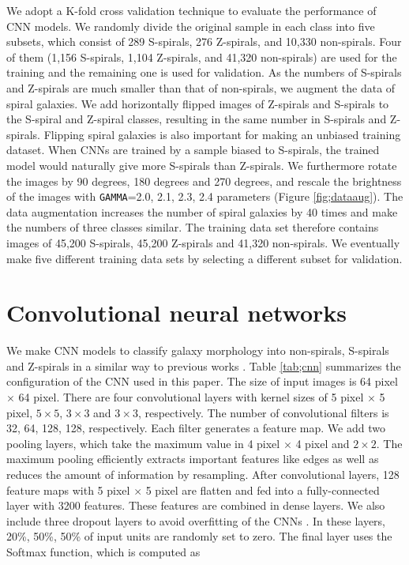 \documentclass[a4paper,fleqn,usenatbib]{mnras}
\begin{document}
We adopt a K-fold cross validation technique to evaluate the performance of CNN models.
We randomly divide the original sample in each class into five subsets, which consist of 289 S-spirals, 276 Z-spirals, and 10,330 non-spirals.
Four of them (1,156 S-spirals, 1,104 Z-spirals, and 41,320 non-spirals) are used for the training and the remaining one is used for validation.
As the numbers of S-spirals and Z-spirals are much smaller than that of non-spirals, we augment the data of spiral galaxies.
We add horizontally flipped images of Z-spirals and S-spirals to the S-spiral and Z-spiral classes, resulting in the same number in S-spirals and Z-spirals. 
Flipping spiral galaxies is also important for making an unbiased training dataset.
When CNNs are trained by a sample biased to S-spirals, the trained model would naturally give more S-spirals than Z-spirals.
We furthermore rotate the images by 90 degrees, 180 degrees and 270 degrees, and rescale the brightness of the images with {\tt GAMMA}=2.0, 2.1, 2.3, 2.4 parameters (Figure \ref{fig;dataaug}).
The data augmentation increases the number of spiral galaxies by 40 times and make the numbers of three classes similar.
The training data set therefore contains images of 45,200 S-spirals, 45,200 Z-spirals and 41,320 non-spirals.
We eventually make five different training data sets by selecting a different subset for validation.

\section{Convolutional neural networks}

We make CNN models to classify galaxy morphology into non-spirals, S-spirals and Z-spirals in a similar way to previous works \citep[e.g.,][]{2015MNRAS.450.1441D}.
Table \ref{tab;cnn} summarizes the configuration of the CNN used in this paper.
The size of input images is 64 pixel $\times$ 64 pixel.
There are four convolutional layers with kernel sizes of 5 pixel $\times$ 5 pixel, $5\times5$, $3\times3$ and $3\times3$, respectively.
The number of convolutional filters is 32, 64, 128, 128, respectively.
Each filter generates a feature map.
We add two pooling layers, which take the maximum value in 4 pixel $\times$ 4 pixel and $2\times2$.
The maximum pooling efficiently extracts important features like edges as well as reduces the amount of information by resampling.
After convolutional layers, 128 feature maps with 5 pixel $\times$ 5 pixel are flatten and fed into a fully-connected layer with 3200 features.
These features are combined in dense layers.
We also include three dropout layers to avoid overfitting of the CNNs \citep{JMLR:v15:srivastava14a}.
In these layers, 20\%, 50\%, 50\% of input units are randomly set to zero.
The final layer uses the Softmax function, which is computed as
\end{document}
